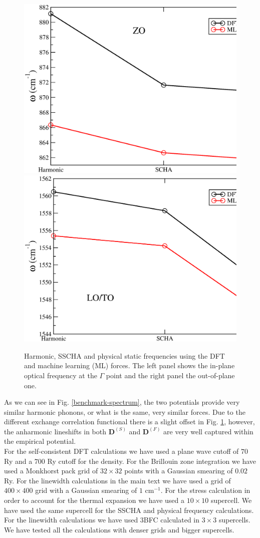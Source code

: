 \begin{figure}[ht]
\includegraphics[width=0.49\linewidth]{Figures/bm1.eps}
\includegraphics[width=0.49\linewidth]{Figures/bm2.eps}
\caption[Harmonic, SSCHA and physical static frequencies using the DFT and machine learning (ML) forces.]{Harmonic, 
	SSCHA and physical static frequencies using the DFT and machine learning (ML) forces. The left panel shows 
	the in-plane optical frequency at the $\Gamma$ point and the right panel the out-of-plane one.}
\label{benchmark}
\end{figure}
As we can see in Fig. \ref{benchmark-spectrum}, the two potentials provide very similar harmonic phonons, or what is 
the same, very similar forces. Due to the different exchange correlation functional there is a slight offset in 
Fig. \ref{benchmark}, however, the anharmonic lineshifts in both $\boldsymbol{D}^{(S)}$ and $\boldsymbol{D}^{(F)}$ 
are very well captured within the empirical potential. \\

For the self-consistent DFT calculations we have used a plane wave cutoff of $70$ Ry and a $700$ Ry cutoff for the 
density. For the Brillouin zone integration we have used a Monkhorst pack grid\cite{monkhorst1976special} of 
$32\times32$ points with a Gaussian smearing of $0.02$ Ry. For the linewidth calculations in the main text we have 
used a grid of $400\times400$ grid with a Gaussian smearing of $1$ cm$^{-1}$. For the stress calculation in order 
to account for the thermal expansion we have used a $10\times10$ supercell. We have used the same supercell for 
the SSCHA and physical frequency calculations. For the linewidth calculations we have used 3BFC calculated in 
$3\times3$ supercells. We have tested all the calculations with denser grids and bigger supercells.

